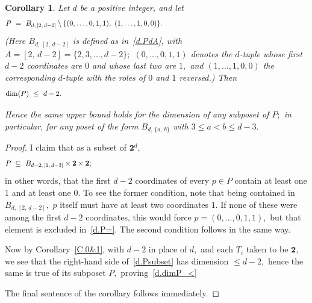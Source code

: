 \documentclass{amsart}
\newtheorem{corollary}[theorem]{Corollary}
\numberwithin{equation}{section}
\numberwithin{theorem}{section}
\newcommand{\2}{\mathbf{2}}
\begin{document}
\begin{corollary}\label{C.P<>}
Let $d$ be a positive integer, and let
%
\begin{equation}\begin{minipage}[c]{35pc}\label{d.P=}
$P \ = \ B_{d,\,[2,\,d-2]}
\setminus\{(0,\dots,0,1,1),\ (1,\dots,1,0,0)\}.$
\end{minipage}\end{equation}
%
\textup{(}Here $B_{d,\,[2,\,d-2]}$ is defined
as in~\eqref{d.PdA}, with $A=[2,\,d\!-\!2]=\{2,3,\dots,d\!-\!2\};$
$(0,\dots,0,1,1)$ denotes the $\!d\!$-tuple whose
first $d\!-\!2$ coordinates are $0$ and whose last two
are $1,$ and $(1,\dots,1,0,0)$ the corresponding
$\!d\!$-tuple with the roles of $0$ and $1$ reversed.\textup{)}
Then
%
\begin{equation}\begin{minipage}[c]{35pc}\label{d.dimP_<}
$\dim(P)\ \leq\ d-2.$
\end{minipage}\end{equation}

Hence the same upper bound holds for the dimension of
any subposet of $P;$
in particular, for any poset of the form $B_{d,\,\{a,\,b\}}$
with $3\leq a < b \leq d-3.$
\end{corollary}

\begin{proof}
I claim that as a subset of $\2^d,$
%
\begin{equation}\begin{minipage}[c]{35pc}\label{d.Psubset}
$P \ \subseteq \ B_{d-2,\,[1,\,d-3]}\times \2\times \2;$
\end{minipage}\end{equation}
%
in other words, that the first $d-2$ coordinates
of every $p\in P$ contain at least one $1$ and at least one $0.$
To see the former condition, note that being contained in
$B_{d,\,[2,\,d-2]},$
$p$ itself must have at least two coordinates $1.$
If none of these were among the first $d-2$ coordinates,
this would force $p=(0,\dots,0,1,1),$ but that element is
excluded in~\eqref{d.P=}.
The second condition follows in the same way.

Now by Corollary~\ref{C.0&1}, with $d-2$ in place of $d,$
and each $T_i$ taken to be $\2,$ we see that the
right-hand side of~\eqref{d.Psubset} has
dimension $\leq d-2,$ hence the same is true of its
subposet $P,$ proving~\eqref{d.dimP_<}

The final sentence of the corollary follows immediately.
\end{proof}
\end{document}
